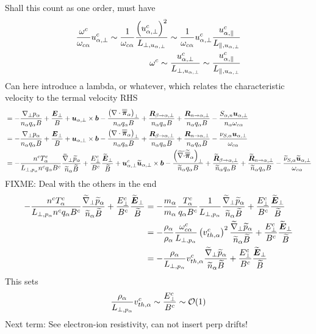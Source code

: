 %
Shall this count as one order, must have
%
\begin{align*}
 \frac{\omega^c}{\omega_{c\alpha}}
 u^c_{\alpha,\perp}
 \sim
 \frac{1}{\omega_{c\alpha}}
 \frac{\left(u^c_{\alpha,\perp}\right)^2}{L_{\perp, u_{\alpha,\perp}}}
 \sim
 \frac{1}{\omega_{c\alpha}}
 u^c_{\alpha,\perp}
 \frac{u^c_{\alpha,\|}}{L_{\|, u_{\alpha,\perp}}}
 \\
 \omega^c
 \sim
 \frac{u^c_{\alpha,\perp}}{L_{\perp, u_{\alpha,\perp}}}
 \sim
 \frac{u^c_{\alpha,\|}}{L_{\|, u_{\alpha,\perp}}}
\end{align*}
%
Can here introduce a lambda, or whatever, which relates the characteristic velocity to the termal velocity
%
RHS
%
\begin{align*}
&=
- \frac{ \nabla_\perp p_\alpha }{n_\alpha  q_\alpha B}
+ \frac{\boldsymbol{E}_\perp}{B}
+ \boldsymbol{u}_{\alpha,\perp}\times\boldsymbol{b}
- \frac{ \left(\nabla\cdot\boldsymbol{\overline{\overline{\pi}}}_\alpha\right)_\perp }{n_\alpha  q_\alpha B}
+ \frac{ \boldsymbol{R}_{\beta \to \alpha,\perp} }{n_\alpha q_\alpha B}
+ \frac{ \boldsymbol{R}_{n \to \alpha,\perp} }{n_\alpha q_\alpha B}
- \frac{ S_{\alpha,n}\boldsymbol{u}_{\alpha,\perp} }{n_\alpha \omega_{c\alpha}}
\\
&=
- \frac{ \nabla_\perp p_\alpha }{n_\alpha  q_\alpha B}
+ \frac{\boldsymbol{E}_\perp}{B}
+ \boldsymbol{u}_{\alpha,\perp}\times\boldsymbol{b}
- \frac{ \left(\nabla\cdot\boldsymbol{\overline{\overline{\pi}}}_\alpha\right)_\perp }{n_\alpha  q_\alpha B}
+ \frac{ \boldsymbol{R}_{\beta \to \alpha,\perp} }{n_\alpha q_\alpha B}
+ \frac{ \boldsymbol{R}_{n \to \alpha,\perp} }{n_\alpha q_\alpha B}
- \frac{ \nu_{S,\alpha}\boldsymbol{u}_{\alpha,\perp} }{\omega_{c\alpha}}
\\
&=
- \frac{n^c T^c_\alpha}{L_{\perp, p_\alpha}n^cq_\alpha B^c}
\frac{ \widetilde{ \nabla}_\perp \widetilde{ p}_\alpha }{\widetilde{ n}_\alpha \widetilde{ B}}
+ \frac{E_\perp^c}{B^c}
\frac{\widetilde{ \boldsymbol{E}}_\perp}{\widetilde{ B}}
+ \boldsymbol{u}^c_{\alpha,\perp}
\widetilde{ \boldsymbol{u}}_{\alpha,\perp}\times\boldsymbol{b}
- \frac{ \left(\widetilde{ \nabla\cdot}\widetilde{ \boldsymbol{\overline{\overline{\pi}}}}_\alpha\right)_\perp }{\widetilde{ n}_\alpha  q_\alpha B}
+ \frac{ \widetilde{ \boldsymbol{R}}_{\beta \to \alpha,\perp} }{\widetilde{ n}_\alpha q_\alpha B}
+ \frac{ \widetilde{ \boldsymbol{R}}_{n \to \alpha,\perp} }{\widetilde{ n}_\alpha q_\alpha B}
- \frac{ \widetilde{ \nu}_{S,\alpha}\widetilde{ \boldsymbol{u}}_{\alpha,\perp} }{\omega_{c\alpha}}
\end{align*}
%
FIXME: Deal with the others in the end
%
\begin{align*}
- \frac{n^c T^c_\a}{L_{\perp, p_\a}n^cq_\a B^c}
\frac{ \wt{\grad}_\perp \wt{p}_\a }{\wt{n}_\a \wt{B}}
+ \frac{E_\perp^c}{B^c}
\frac{\wt{\ve{E}}_\perp}{\wt{B}}
&=
- \frac{m_\a}{m_\a}\frac{T^c_\a}{q_\a B^c}
\frac{1}{L_{\perp, p_\a}}
\frac{ \wt{\grad}_\perp \wt{p}_\a }{\wt{n}_\a \wt{B}}
+ \frac{E_\perp^c}{B^c}
\frac{\wt{\ve{E}}_\perp}{\wt{B}}
\\
%
%
&=
- \frac{\rho_\a}{\rho_\a}
\frac{\om^c_{c\a}}{L_{\perp, p_\a}}\L(v^c_{th,\a}\R)^2
\frac{ \wt{\grad}_\perp \wt{p}_\a }{\wt{n}_\a \wt{B}}
+ \frac{E_\perp^c}{B^c}
\frac{\wt{\ve{E}}_\perp}{\wt{B}}
\\
%
%
&=
- \frac{\rho_\a}{L_{\perp, p_\a}}v^c_{th,\a}
\frac{ \wt{\grad}_\perp \wt{p}_\a }{\wt{n}_\a \wt{B}}
+ \frac{E_\perp^c}{B^c}
\frac{\wt{\ve{E}}_\perp}{\wt{B}}
\end{align*}
%
This sets
%
\begin{align*}
    \frac{\rho_{\alpha}}{L_{\perp, p_\alpha}}v^c_{th,\alpha} \sim \frac{E_\perp^c}{B^c} \sim \mathcal{O}(1)
\end{align*}
%
%
Next term: See electron-ion resistivity, can not insert perp drifts!

